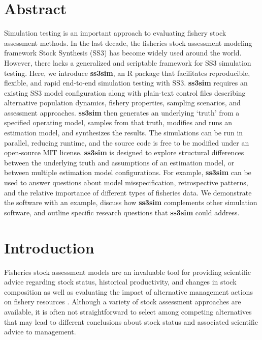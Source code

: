 \section*{Abstract}

Simulation testing is an important approach to evaluating fishery stock
assessment methods. In the last decade, the fisheries stock assessment modeling
framework Stock Synthesis (SS3) has become widely used around the world.
However, there lacks a generalized and scriptable framework for SS3 simulation
testing. Here, we introduce \textbf{ss3sim}, an \textsf{R} package that
facilitates reproducible, flexible, and rapid end-to-end simulation
testing with SS3. \textbf{ss3sim} requires an existing SS3 model configuration
along with plain-text control files describing alternative population dynamics,
fishery properties, sampling scenarios, and assessment approaches.
\textbf{ss3sim} then generates an underlying `truth' from a specified
operating model, samples from that truth, modifies and runs an estimation
model, and synthesizes the results. The simulations can be run in parallel,
reducing runtime, and the source code is free to be modified under an
open-source MIT license. \textbf{ss3sim} is designed to explore structural
differences between the underlying truth and assumptions of an estimation
model, or between multiple estimation model configurations. For example,
\textbf{ss3sim} can be used to answer questions about model misspecification,
retrospective patterns, and the relative importance of different types of
fisheries data. We demonstrate the software with an example, discuss how
\textbf{ss3sim} complements other simulation software, and outline specific
research questions that \textbf{ss3sim} could address.

\section*{Introduction}

Fisheries stock assessment models are an invaluable tool for providing
scientific advice regarding stock status, historical productivity, and
changes in stock composition as well as evaluating the impact of alternative
management actions on fishery resources \cite{gulland1983, hilborn1992}.
Although a variety of stock assessment approaches are available, it is often
not straightforward to select among competing alternatives that may lead
to different conclusions about stock status and associated scientific
advice to management.


